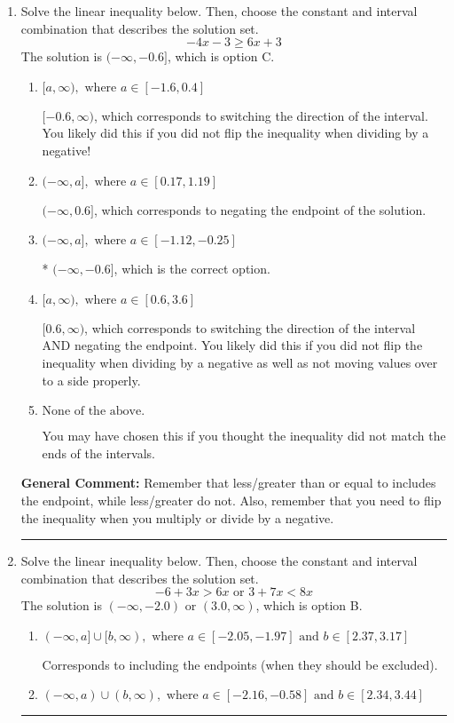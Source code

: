 \documentclass{extbook}[14pt]
\newcommand{\litem}[1]{\item #1

\rule{\textwidth}{0.4pt}}
\begin{document}
\begin{enumerate}\litem{
Solve the linear inequality below. Then, choose the constant and interval combination that describes the solution set.
\[ -4x -3 \geq 6x + 3 \]The solution is \( (-\infty, -0.6] \), which is option C.\begin{enumerate}[label=\Alph*.]
\item \( [a, \infty), \text{ where } a \in [-1.6, 0.4] \)

 $[-0.6, \infty)$, which corresponds to switching the direction of the interval. You likely did this if you did not flip the inequality when dividing by a negative!
\item \( (-\infty, a], \text{ where } a \in [0.17, 1.19] \)

 $(-\infty, 0.6]$, which corresponds to negating the endpoint of the solution.
\item \( (-\infty, a], \text{ where } a \in [-1.12, -0.25] \)

* $(-\infty, -0.6]$, which is the correct option.
\item \( [a, \infty), \text{ where } a \in [0.6, 3.6] \)

 $[0.6, \infty)$, which corresponds to switching the direction of the interval AND negating the endpoint. You likely did this if you did not flip the inequality when dividing by a negative as well as not moving values over to a side properly.
\item \( \text{None of the above}. \)

You may have chosen this if you thought the inequality did not match the ends of the intervals.
\end{enumerate}

\textbf{General Comment:} Remember that less/greater than or equal to includes the endpoint, while less/greater do not. Also, remember that you need to flip the inequality when you multiply or divide by a negative.
}
\litem{
Solve the linear inequality below. Then, choose the constant and interval combination that describes the solution set.
\[ -6 + 3 x > 6 x \text{ or } 3 + 7 x < 8 x \]The solution is \( (-\infty, -2.0) \text{ or } (3.0, \infty) \), which is option B.\begin{enumerate}[label=\Alph*.]
\item \( (-\infty, a] \cup [b, \infty), \text{ where } a \in [-2.05, -1.97] \text{ and } b \in [2.37, 3.17] \)

Corresponds to including the endpoints (when they should be excluded).
\item \( (-\infty, a) \cup (b, \infty), \text{ where } a \in [-2.16, -0.58] \text{ and } b \in [2.34, 3.44] \)


\end{enumerate}}
\end{enumerate}
\end{document}
